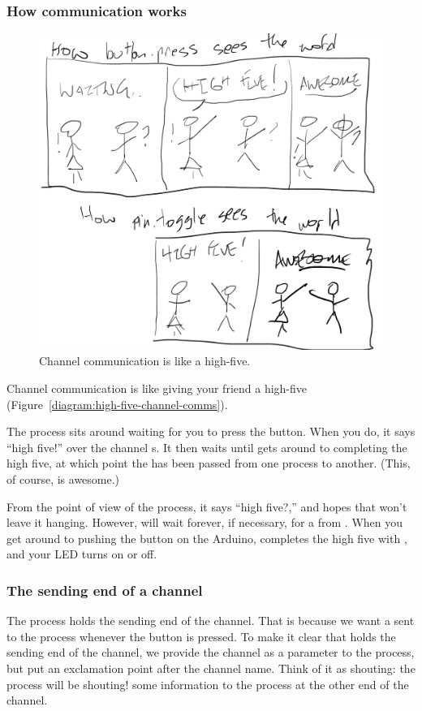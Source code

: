\subsubsection{How communication works}

\begin{figure}[h]
  \begin{center}
    \includegraphics[width=0.8\linewidth]{images/ch4-high-five-channel-comms}
    \caption{Channel communication is like a high-five.}
    \label{diagram:ch4-high-five-channel-comms}
  \end{center}
\end{figure}

Channel communication is like giving your friend a high-five (Figure~\vref{diagram:high-five-channel-comms}).


The process \bp sits around waiting for you to press the button. When you do, it says ``high five!'' over the channel {\code s}. It then waits until \tp gets around to completing the high five, at which point the \SIGNALV has been passed from one process to another. (This, of course, is awesome.)

From the point of view of the \tp process, it says ``high five?,'' and hopes that \bp won't leave it hanging. However, \tp will wait forever, if necessary, for a \SIGNALV from \bp. When you get around to pushing the button on the Arduino, \bp completes the high five with \tp, and your LED turns on or off.


\subsubsection{The sending end of a channel}
The \bp process holds the sending end of the channel. That is because we want a \SIGNALV sent to the \tp process whenever the button is pressed. To make it clear that \bp holds the sending end of the channel, we provide the channel as a parameter to the process, but put an exclamation point after the channel name. Think of it as shouting: the \bp process will be shouting! some information to the process at the other end of the channel.

